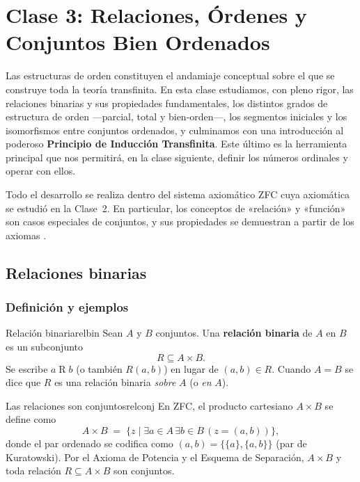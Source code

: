 \chapter{Clase 3: Relaciones, Órdenes y Conjuntos Bien Ordenados}

Las estructuras de orden constituyen el andamiaje conceptual sobre el que se construye toda la teoría transfinita. En esta clase estudiamos, con pleno rigor, las relaciones binarias y sus propiedades fundamentales, los distintos grados de estructura de orden —parcial, total y bien-orden—, los segmentos iniciales y los isomorfismos entre conjuntos ordenados, y culminamos con una introducción al poderoso \textbf{Principio de Inducción Transfinita}. Este último es la herramienta principal que nos permitirá, en la clase siguiente, definir los números ordinales y operar con ellos.

Todo el desarrollo se realiza dentro del sistema axiomático ZFC cuya axiomática se estudió en la Clase~2. En particular, los conceptos de «relación» y «función» son casos especiales de conjuntos, y sus propiedades se demuestran a partir de los axiomas \cite{jech2003, kunen2011, enderton1977}.

\section{Relaciones binarias}

\subsection{Definición y ejemplos}

\begin{definicion}{Relación binaria}{relbin}
Sean $A$ y $B$ conjuntos. Una \textbf{relación binaria} de $A$ en $B$ es un subconjunto
\[
  R \subseteq A \times B.
\]
Se escribe $a \mathrel{R} b$ (o también $R(a,b)$) en lugar de $(a,b) \in R$. Cuando $A = B$ se dice que $R$ es una relación binaria \emph{sobre} $A$ (o \emph{en} $A$).
\end{definicion}

\begin{observacion}{Las relaciones son conjuntos}{relconj}
En ZFC, el producto cartesiano $A \times B$ se define como
\[
  A \times B \;=\; \bigl\{z \mid \exists a \in A\,\exists b \in B\,(z = (a,b))\bigr\},
\]
donde el par ordenado se codifica como $(a,b) = \{\{a\}, \{a,b\}\}$ (par de Kuratowski). Por el Axioma de Potencia y el Esquema de Separación, $A \times B$ y toda relación $R \subseteq A \times B$ son conjuntos.
\end{observacion}

